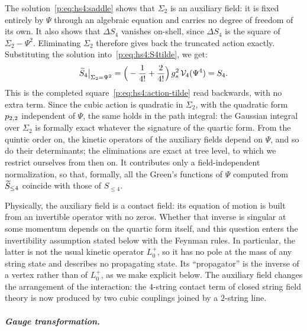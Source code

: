 The solution~\eqref{p:eq:hs4:saddle} shows that $\Sigma_2$ is an auxiliary field: it is fixed entirely by $\Psi$ through an algebraic equation and carries no degree of freedom of its own.
It also shows that $\Delta S_4$ vanishes on-shell, since $\Delta S_4$ is the square of $\Sigma_2 - \Psi^2$.
Eliminating $\Sigma_2$ therefore gives back the truncated action exactly.
Substituting the solution into~\eqref{p:eq:hs4:S4tilde}, we get:
\begin{equation}
  \label{p:eq:hs4:eliminate}
  \caction[4] \big|_{\Sigma_2 = \Psi^2}
    = \Big( - \frac{1}{4!} + \frac{2}{4!} \Big) \, \gs^2 \, \vertex{4}(\Psi^4)
    = S_4.
\end{equation}
This is the completed square~\eqref{p:eq:hs4:action-tilde} read backwards, with no extra term.
Since the cubic action is quadratic in $\Sigma_2$, with the quadratic form $\sprod{2}{2}$ independent of $\Psi$, the same holds in the path integral: the Gaussian integral over $\Sigma_2$ is formally exact whatever the signature of the quartic form.
From the quintic order on, the kinetic operators of the auxiliary fields depend on $\Psi$, and so do their determinants; the eliminations are exact at tree level, to which we restrict ourselves from then on.
It contributes only a field-independent normalization, so that, formally, all the Green's functions of $\Psi$ computed from $\caction[\le 4]$ coincide with those of $S_{\le 4}$.

Physically, the auxiliary field is a contact field: its equation of motion is built from an invertible operator with no zeros.
Whether that inverse is singular at some momentum depends on the quartic form itself, and this question enters the invertibility assumption stated below with the Feynman rules.
In particular, the latter is not the usual kinetic operator $L_0^+$, so it has no pole at the mass of any string state and describes no propagating state.
Its ``propagator'' is the inverse of a vertex rather than of $L_0^+$, as we make explicit below.
The auxiliary field changes the arrangement of the interaction: the $4$-string contact term of closed string field theory is now produced by two cubic couplings joined by a $2$-string line.


\subparagraph{Gauge transformation.}

